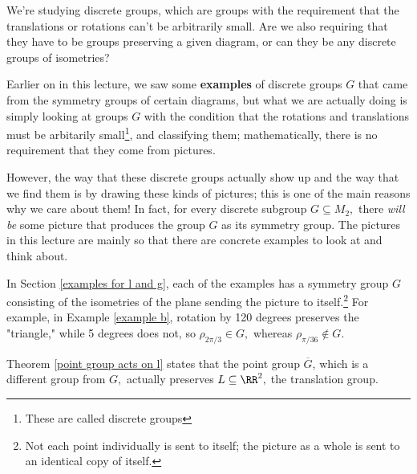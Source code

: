 \begin{question}%

We're studying discrete groups, which are groups with the requirement that the translations or rotations can't be arbitrarily small. Are we also requiring that they have to be groups preserving a given diagram, or can they be any discrete groups of isometries? 



\end{question}
\begin{ans}
Earlier on in this lecture, we saw some \textbf{examples} of discrete groups $G$ that came from the symmetry groups of certain diagrams, but what we are actually doing is simply looking at groups $G$ with the condition that the rotations and translations must be arbitarily small\footnote{These are called discrete groups}, and classifying them; mathematically, there is no requirement that they come from pictures. 

However, the way that these discrete groups actually show up and the way that we find them is by drawing these kinds of pictures; this is one of the main reasons why we care about them! In fact, for every discrete subgroup $G \subseteq M_2,$ there \emph{will be} some picture that produces the group $G$ as its symmetry group. The pictures in this lecture are mainly so that there are concrete examples to look at and think about. 

In Section \ref{examples for l and g}, each of the examples has a symmetry group $G$ consisting of the isometries of the plane sending the picture to itself.\footnote{Not each point individually is sent to itself; the picture as a whole is sent to an identical copy of itself.} For example, in Example \ref{example b}, rotation by 120 degrees preserves the "triangle," while 5 degrees does not, so $\rho_{2\pi/3} \in G,$ whereas $\rho_{\pi/36} \notin G.$ 


\end{ans}

Theorem \ref{point group acts on l} states that the point group $\overline{G}$, which is a different group from $G,$ actually preserves $L \subseteq \RR^2,$ the translation group. 

